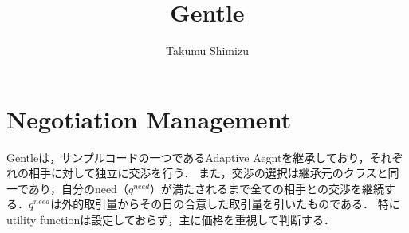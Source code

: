 \documentclass[uplatex, 10pt, a4j]{jsarticle}
\begin{document}
\title{Gentle}
\author{Takumu Shimizu}
\date{\vspace{-15mm}}

\maketitle

\section{\textrm{Negotiation Management}}
Gentleは，サンプルコードの一つであるAdaptive Aegntを継承しており，それぞれの相手に対して独立に交渉を行う．
また，交渉の選択は継承元のクラスと同一であり，自分のneed（$q^{need}$）が満たされるまで全ての相手との交渉を継続する．$q^{need}$は外的取引量からその日の合意した取引量を引いたものである．
特にutility functionは設定しておらず，主に価格を重視して判断する．
\end{document}
